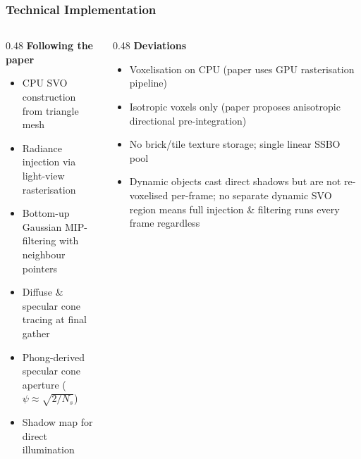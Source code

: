 \documentclass{beamer}
\begin{document}
\begin{frame}
\frametitle{Technical Implementation}

\begin{columns}[T]
    \begin{column}{0.48\textwidth}
        \textbf{Following the paper}
        \begin{itemize}
            \item CPU SVO construction from triangle mesh
            \item Radiance injection via light-view rasterisation
            \item Bottom-up Gaussian MIP-filtering with neighbour pointers
            \item Diffuse \& specular cone tracing at final gather
            \item Phong-derived specular cone aperture ($\psi \approx \sqrt{2/N_s}$)
            \item Shadow map for direct illumination
        \end{itemize}
    \end{column}
    \begin{column}{0.48\textwidth}
        \textbf{Deviations}
        \begin{itemize}
            \item Voxelisation on CPU (paper uses GPU rasterisation pipeline)
            \item Isotropic voxels only (paper proposes anisotropic directional pre-integration)
            \item No brick/tile texture storage; single linear SSBO pool
            \item Dynamic objects cast direct shadows but are not re-voxelised per-frame; no separate dynamic SVO region means full injection \& filtering runs every frame regardless
        \end{itemize}
    \end{column}
\end{columns}

\end{frame}

\end{document}
